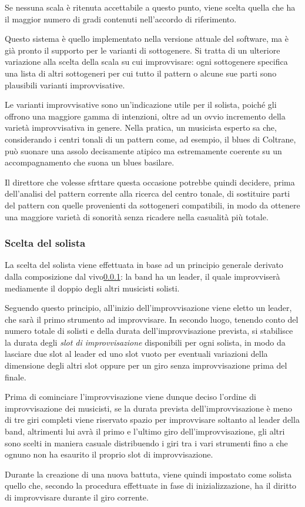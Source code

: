 Se nessuna scala è ritenuta accettabile a questo punto, viene scelta quella che ha il maggior numero di gradi contenuti nell'accordo di riferimento.

Questo sistema è quello implementato nella versione attuale del software, ma è già pronto il supporto per le varianti di sottogenere. Si tratta di un ulteriore variazione alla scelta della scala su cui improvvisare: ogni sottogenere specifica una lista di altri sottogeneri per cui tutto il pattern o alcune sue parti sono plausibili varianti improvvisative.

Le varianti improvvisative sono un'indicazione utile per il solista, poiché gli offrono una maggiore gamma di intenzioni, oltre ad un ovvio incremento della varietà improvvisativa in genere. Nella pratica, un musicista esperto sa che, considerando i centri tonali di un pattern come, ad esempio, il blues di Coltrane, può suonare una assolo decisamente atipico ma estremamente coerente su un accompagnamento che suona un blues basilare.

Il direttore che volesse sfrttare questa occasione potrebbe quindi decidere, prima dell'analisi del pattern corrente alla ricerca del centro tonale, di sostituire parti del pattern con quelle provenienti da sottogeneri compatibili, in modo da ottenere una maggiore varietà di sonorità senza ricadere nella casualità più totale.

\subsubsection{Scelta del solista}
La scelta del solista viene effettuata in base ad un principio generale derivato dalla composizione dal vivo\ref{}: la band ha un leader, il quale improvviserà mediamente il doppio degli altri musicisti solisti.

Seguendo questo principio, all'inizio dell'improvvisazione viene eletto un leader, che sarà il primo strumento ad improvvisare. In secondo luogo, tenendo conto del numero totale di solisti e della durata dell'improvvisazione prevista, si stabilisce la durata degli \emph{slot di improvvisazione} disponibili per ogni solista, in modo da lasciare due slot al leader ed uno slot vuoto per eventuali variazioni della dimensione degli altri slot oppure per un giro senza improvvisazione prima del finale.

Prima di cominciare l'improvvisazione viene dunque deciso l'ordine di improvvisazione dei musicisti, se la durata prevista dell'improvvisazione è meno di tre giri completi viene riservato spazio per improvvisare soltanto al leader della band, altrimenti lui avrà il primo e l'ultimo giro dell'improvvisazione, gli altri sono scelti in maniera casuale distribuendo i giri tra i vari strumenti fino a che ognuno non ha esaurito il proprio slot di improvvisazione.

Durante la creazione di una nuova battuta, viene quindi impostato come solista quello che, secondo la procedura effettuate in fase di inizializzazione, ha il diritto di improvvisare durante il giro corrente.

